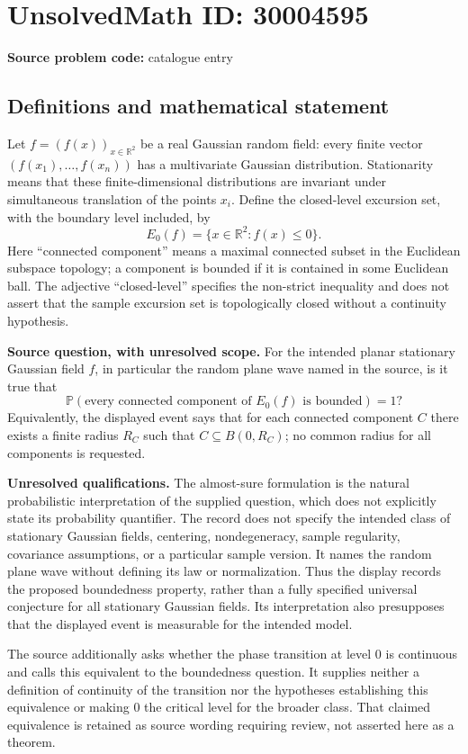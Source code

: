 \documentclass[11pt]{article}
\newcommand{\R}{\mathbb{R}}
\begin{document}
\section*{UnsolvedMath ID: 30004595}
\textbf{Source problem code:} catalogue entry
\subsection{Definitions and mathematical statement}
Let \(f=(f(x))_{x\in\R^2}\) be a real Gaussian random field: every finite vector \((f(x_1),\ldots,f(x_n))\) has a multivariate Gaussian distribution. Stationarity means that these finite-dimensional distributions are invariant under simultaneous translation of the points \(x_i\). Define the closed-level excursion set, with the boundary level included, by
\[
E_0(f)=\{x\in\R^2:f(x)\leq 0\}.
\]
Here ``connected component'' means a maximal connected subset in the Euclidean subspace topology; a component is bounded if it is contained in some Euclidean ball. The adjective ``closed-level'' specifies the non-strict inequality and does not assert that the sample excursion set is topologically closed without a continuity hypothesis.

\textbf{Source question, with unresolved scope.} For the intended planar stationary Gaussian field \(f\), in particular the random plane wave named in the source, is it true that
\[
\mathbb P\!\left(\text{every connected component of }E_0(f)\text{ is bounded}\right)=1?
\]
Equivalently, the displayed event says that for each connected component \(C\) there exists a finite radius \(R_C\) such that \(C\subseteq B(0,R_C)\); no common radius for all components is requested.

\textbf{Unresolved qualifications.} The almost-sure formulation is the natural probabilistic interpretation of the supplied question, which does not explicitly state its probability quantifier. The record does not specify the intended class of stationary Gaussian fields, centering, nondegeneracy, sample regularity, covariance assumptions, or a particular sample version. It names the random plane wave without defining its law or normalization. Thus the display records the proposed boundedness property, rather than a fully specified universal conjecture for all stationary Gaussian fields. Its interpretation also presupposes that the displayed event is measurable for the intended model.

The source additionally asks whether the phase transition at level \(0\) is continuous and calls this equivalent to the boundedness question. It supplies neither a definition of continuity of the transition nor the hypotheses establishing this equivalence or making \(0\) the critical level for the broader class. That claimed equivalence is retained as source wording requiring review, not asserted here as a theorem.
\end{document}
